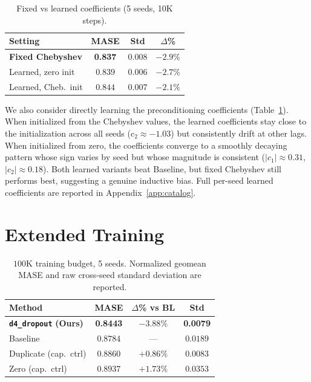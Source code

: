 \documentclass{article}
\begin{document}
\begin{table}[t]
\caption{Fixed vs learned coefficients (5 seeds, 10K steps).}
\label{tab:learned-coeff-main}
\vskip 0.05in
\centering
\small
\setlength{\tabcolsep}{3pt}
\begin{tabular}{@{}lccc@{}}
\toprule
\textbf{Setting} & \textbf{MASE} & \textbf{Std} & \textbf{$\Delta$\%} \\
\midrule
\textbf{Fixed Chebyshev} & \textbf{0.837} & $0.008$ & $\mathbf{-2.9\%}$ \\
Learned, zero init & $0.839$ & $0.006$ & $-2.7\%$ \\
Learned, Cheb.\ init & $0.844$ & $0.007$ & $-2.1\%$ \\
\bottomrule
\end{tabular}
\end{table}

We also consider directly learning the preconditioning coefficients (Table~\ref{tab:learned-coeff-main}). When initialized from the Chebyshev values, the learned coefficients stay close to the initialization across all seeds (c$_2 \approx -1.03$) but consistently drift at other lags. When initialized from zero, the coefficients converge to a smoothly decaying pattern whose sign varies by seed but whose magnitude is consistent ($|c_1| \approx 0.31$, $|c_2| \approx 0.18$). Both learned variants beat Baseline, but fixed Chebyshev still performs best, suggesting a genuine inductive bias. Full per-seed learned coefficients are reported in Appendix~\ref{app:catalog}.

\section{Extended Training}
\label{sec:extended}

\begin{table}[t]
\caption{$100$K training budget, 5 seeds. Normalized geomean MASE and raw cross-seed standard deviation are reported.}
\label{tab:100k}
\vskip 0.1in
\centering
\small
\setlength{\tabcolsep}{3pt}
\begin{tabular}{@{}lccc@{}}
\toprule
\textbf{Method} & \textbf{MASE} & \textbf{$\Delta$\% vs BL} & \textbf{Std} \\
\midrule
\textbf{\texttt{d4\_dropout}} \textbf{(Ours)} & \textbf{0.8443} & \textbf{$-3.88\%$} & \textbf{0.0079} \\
Baseline            & $0.8784$        & ---               & $0.0189$ \\
Duplicate (cap.\ ctrl) & $0.8860$        & $+0.86\%$         & $0.0083$ \\
Zero (cap.\ ctrl)      & $0.8937$        & $+1.73\%$         & $0.0353$ \\
\bottomrule
\end{tabular}
\end{table}
\end{document}
